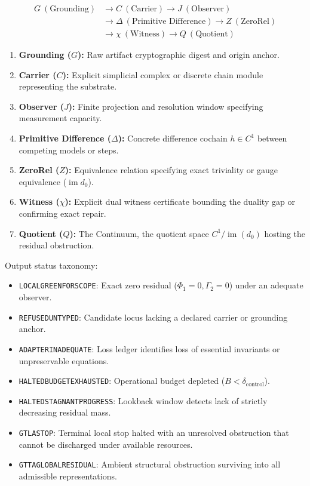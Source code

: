 \documentclass[
  11pt,
]{article}
\providecommand{\tightlist}{%
  \setlength{\itemsep}{0pt}\setlength{\parskip}{0pt}}
\renewcommand{\_}{\origunderscore\allowbreak}
\begin{document}
\[\begin{aligned}
G \ (\text{Grounding}) &\longrightarrow C \ (\text{Carrier}) \longrightarrow J \ (\text{Observer}) \\
&\longrightarrow \Delta \ (\text{Primitive Difference}) \longrightarrow Z \ (\text{ZeroRel}) \\
&\longrightarrow \chi \ (\text{Witness}) \longrightarrow Q \ (\text{Quotient})
\end{aligned}\]

\begin{enumerate}
\def\labelenumi{\arabic{enumi}.}
\tightlist
\item
  \textbf{Grounding (\(G\)):} Raw artifact cryptographic digest and
  origin anchor.
\item
  \textbf{Carrier (\(C\)):} Explicit simplicial complex or discrete
  chain module representing the substrate.
\item
  \textbf{Observer (\(J\)):} Finite projection and resolution window
  specifying measurement capacity.
\item
  \textbf{Primitive Difference (\(\Delta\)):} Concrete difference
  cochain \(h \in C^1\) between competing models or steps.
\item
  \textbf{ZeroRel (\(Z\)):} Equivalence relation specifying exact
  triviality or gauge equivalence (\(\operatorname{im} d_0\)).
\item
  \textbf{Witness (\(\chi\)):} Explicit dual witness certificate
  bounding the duality gap or confirming exact repair.
\item
  \textbf{Quotient (\(Q\)):} The Continuum, the quotient space
  \(C^1 / \operatorname{im}(d_0)\) hosting the residual obstruction.
\end{enumerate}

Output status taxonomy:

\begin{itemize}
\tightlist
\item
  \texttt{LOCAL\_GREEN\_FOR\_SCOPE}: Exact zero residual
  (\(\Phi_1 = 0, \Gamma_2 = 0\)) under an adequate observer.
\item
  \texttt{REFUSED\_UNTYPED}: Candidate locus lacking a declared carrier
  or grounding anchor.
\item
  \texttt{ADAPTER\_INADEQUATE}: Loss ledger identifies loss of essential
  invariants or unpreservable equations.
\item
  \texttt{HALTED\_BUDGET\_EXHAUSTED}: Operational budget depleted
  (\(B < \delta_{\text{control}}\)).
\item
  \texttt{HALTED\_STAGNANT\_PROGRESS}: Lookback window detects lack of
  strictly decreasing residual mass.
\item
  \texttt{GTLA\_STOP}: Terminal local stop halted with an unresolved
  obstruction that cannot be discharged under available resources.
\item
  \texttt{GTTA\_GLOBAL\_RESIDUAL}: Ambient structural obstruction
  surviving into all admissible representations.
\end{itemize}
\end{document}
